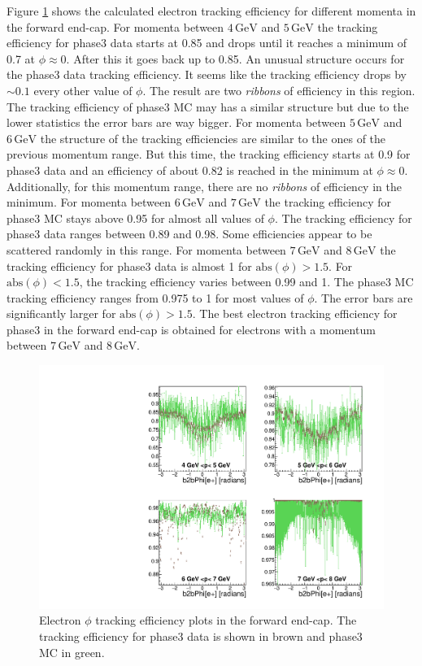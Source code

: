 \documentclass[a4paper,11pt,twosided,final,german,openbib,pdftex,listof=totoc,bibliography=totoc]{scrbook}
\begin{document}
Figure \ref{plt:xPMPhiemFC3} shows the calculated electron tracking efficiency for different momenta in the forward end-cap.
For momenta between $4\,\textrm{GeV}$ and $5\,\textrm{GeV}$ the tracking efficiency for phase3 data starts at 0.85 and drops until it reaches a minimum of 0.7 at $\phi \approx 0$. After this it goes back up to 0.85. An unusual structure occurs for the phase3 data tracking efficiency. It seems like the tracking efficiency drops by $\sim 0.1$ every other value of $\phi$. The result are two \textit{ribbons} of efficiency in this region. The tracking efficiency of phase3 MC may has a similar structure but due to the lower statistics the error bars are way bigger.
For momenta between $5\,\textrm{GeV}$ and $6\,\textrm{GeV}$ the structure of the tracking efficiencies are similar to the ones of the previous momentum range. But this time, the tracking efficiency starts at 0.9 for phase3 data and an efficiency of about 0.82 is reached in the minimum at $\phi \approx 0$. Additionally, for this momentum range, there are no \textit{ribbons} of efficiency in the minimum.
For momenta between $6\,\textrm{GeV}$ and $7\,\textrm{GeV}$ the tracking efficiency for phase3 MC stays above 0.95 for almost all values of $\phi$. The tracking efficiency for phase3 data ranges between 0.89 and 0.98. Some efficiencies appear to be scattered randomly in this range.
For momenta between $7\,\textrm{GeV}$ and $8\,\textrm{GeV}$ the tracking efficiency for phase3 data is almost 1 for $\textrm{abs}(\phi) > 1.5$. For $\textrm{abs}(\phi) < 1.5$, the tracking efficiency varies between 0.99 and 1. The phase3 MC tracking efficiency ranges from 0.975 to 1 for most values of $\phi$. The error bars are significantly larger for $\textrm{abs}(\phi) > 1.5$.
The best electron tracking efficiency for phase3 in the forward end-cap is obtained for electrons with a momentum between $7\,\textrm{GeV}$ and $8\,\textrm{GeV}$.

\begin{figure}[!htbp]
	\centering
	\includegraphics[width=\textwidth]{Plots/master3/xPMPhiemFCP3}
	\caption[Momentum $\phi$ Electron Forward End-Cap Efficiency Phase3]{Electron $\phi$ tracking efficiency plots in the forward end-cap. The tracking efficiency for phase3 data is shown in brown and phase3 MC in green.}
	\label{plt:xPMPhiemFC3}
\end{figure}
\end{document}
